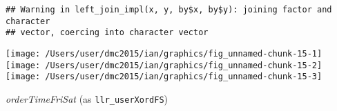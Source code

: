 \documentclass[10pt]{report}
\newenvironment{Shaded}{}{}
\newcommand{\KeywordTok}[1]{\textcolor[rgb]{0.00,0.44,0.13}{\textbf{{#1}}}}
\newcommand{\DataTypeTok}[1]{\textcolor[rgb]{0.56,0.13,0.00}{{#1}}}
\newcommand{\StringTok}[1]{\textcolor[rgb]{0.25,0.44,0.63}{{#1}}}
\newcommand{\NormalTok}[1]{{#1}}
\begin{document}
\begin{Shaded}
\end{Shaded}

\begin{verbatim}
## Warning in left_join_impl(x, y, by$x, by$y): joining factor and character
## vector, coercing into character vector
\end{verbatim}

\begin{Shaded}
\end{Shaded}

\begin{center}\texttt{[image: /Users/user/dmc2015/ian/graphics/fig\_unnamed-chunk-15-1]} \texttt{[image: /Users/user/dmc2015/ian/graphics/fig\_unnamed-chunk-15-2]} \texttt{[image: /Users/user/dmc2015/ian/graphics/fig\_unnamed-chunk-15-3]} \end{center}

\emph{orderTimeFriSat} (as \texttt{llr\_userXordFS})
\end{document}
